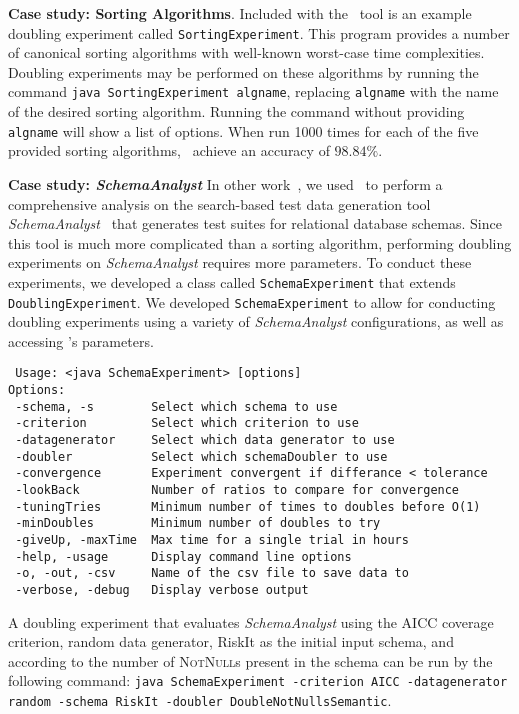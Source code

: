     \lstset{language=bash}

    {\bf Case study: Sorting Algorithms}.  Included with the
    \toolname~tool is an example doubling experiment called
    \texttt{SortingExperiment}.  This program provides a number of
    canonical sorting algorithms with well-known worst-case time
    complexities.  Doubling experiments may be performed on these
    algorithms by running the command \texttt{java SortingExperiment
    algname}, replacing \texttt{algname} with the name of the desired
    sorting algorithm. Running the command without providing
    \texttt{algname} will show a list of options. When run 1000 times
    for each of the five provided sorting algorithms, \toolname~achieve
    an accuracy of $98.84\%$.

    {\bf Case study: \textit{SchemaAnalyst}} In other
    work~\cite{kinneer2015}, we used \toolname~to perform a
    comprehensive analysis on the search-based test data generation tool
    \textit{SchemaAnalyst}~\cite{kapfhammer2013} that generates test
    suites for relational database schemas. Since this tool is much more
    complicated than a sorting algorithm, performing doubling
    experiments on \textit{SchemaAnalyst} requires more parameters.  To
    conduct these experiments, we developed a class called
    \texttt{SchemaExperiment} that extends \texttt{DoublingExperiment}.
    We developed \texttt{SchemaExperiment} to allow for conducting
    doubling experiments using a variety of \textit{SchemaAnalyst}
    configurations, as well as accessing \toolname's parameters.

{\scriptsize
\begin{verbatim}
 Usage: <java SchemaExperiment> [options]
Options:
 -schema, -s        Select which schema to use
 -criterion         Select which criterion to use
 -datagenerator     Select which data generator to use
 -doubler           Select which schemaDoubler to use
 -convergence       Experiment convergent if differance < tolerance
 -lookBack          Number of ratios to compare for convergence
 -tuningTries       Minimum number of times to doubles before O(1)
 -minDoubles        Minimum number of doubles to try
 -giveUp, -maxTime  Max time for a single trial in hours
 -help, -usage      Display command line options
 -o, -out, -csv     Name of the csv file to save data to
 -verbose, -debug   Display verbose output
\end{verbatim}
}

    A doubling experiment that evaluates \textit{SchemaAnalyst} using
    the AICC coverage criterion, random data generator, RiskIt as the initial input
    schema, and according to the number of \textsc{NotNull}s present in the
    schema can be run by the following command:
    \texttt{java SchemaExperiment -criterion AICC -datagenerator random
    -schema RiskIt -doubler DoubleNotNullsSemantic}.
